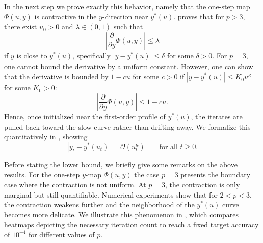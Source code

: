 \documentclass{article}
\newcommand{\bigo}[1]{\mathcal{O}( #1 )}
\begin{document}
In the next step we prove exactly this behavior, namely that the one-step map $\Phi(u,y)$ is contractive in the $y$-direction near $y^*(u)$.
 proves that for $p > 3$, there exist $u_0>0$ and $\lambda \in (0,1)$ such that
\[
    \left|\frac{\partial}{\partial y}\Phi(u,y)\right|\le \lambda
\]
if $y$ is close to $y^*(u)$, specifically $|y-y^*(u)|\le \delta$ for some $\delta>0$.
For $p=3$, one cannot bound the derivative by a uniform constant.
However, one can show that the derivative is bounded by $1-cu$ for some $c>0$ if $|y-y^*(u)|\le K_0 u^\kappa$ for some $K_0>0$:
\[
    \left|\frac{\partial}{\partial y}\Phi(u,y)\right|\le 1-cu.
\]
Hence, once initialized near the first-order profile of $y^*(u)$, the iterates are pulled back toward the slow curve rather than drifting away.
We formalize this quantitatively in , showing
\begin{equation}
    \label{eq:tracking-estimate}
    |y_t-y^*(u_t)|=\bigo{u_t^\kappa}
    \qquad\text{for all }t\ge 0.
\end{equation}

Before stating the lower bound, we briefly give some remarks on the above results.
For the one-step $y$-map $\Phi(u,y)$ the case $p=3$ presents the boundary case where the contraction is not uniform.
At $p=3$, the contraction is only marginal but still quantifiable.
Numerical experiments show that for $2<p<3$, the contraction weakens further and the neighborhood of the $y^*(u)$ curve becomes more delicate.
We illustrate this phenomenon in , which compares heatmaps depicting the necessary iteration count to reach a fixed target accuracy of $10^{-4}$ for different values of $p$.
\end{document}
